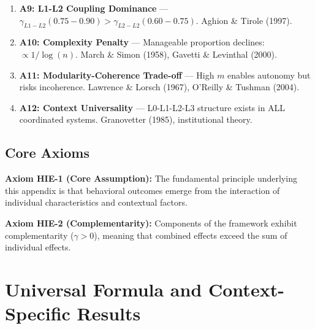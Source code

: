 \begin{enumerate}
\item \textbf{A9: L1-L2 Coupling Dominance} — $\gamma_{L1-L2} (0.75-0.90) > \gamma_{L2-L2} (0.60-0.75)$. Aghion \& Tirole (1997).

\item \textbf{A10: Complexity Penalty} — Manageable proportion declines: $\propto 1/\log(n)$. March \& Simon (1958), Gavetti \& Levinthal (2000).

\item \textbf{A11: Modularity-Coherence Trade-off} — High $m$ enables autonomy but risks incoherence. Lawrence \& Lorsch (1967), O'Reilly \& Tushman (2004).

\item \textbf{A12: Context Universality} — L0-L1-L2-L3 structure exists in ALL coordinated systems. Granovetter (1985), institutional theory.

\end{enumerate}



\subsection{Core Axioms}
\label{sec:hie-axioms}

\begin{tcolorbox}[colback=yellow!5!white,colframe=yellow!75!black,title=Axiom HIE-1: Fundamental Principle]
\textbf{Axiom HIE-1 (Core Assumption):}
The fundamental principle underlying this appendix is that behavioral outcomes
emerge from the interaction of individual characteristics and contextual factors.
\end{tcolorbox}

\begin{tcolorbox}[colback=yellow!5!white,colframe=yellow!75!black,title=Axiom HIE-2: Complementarity]
\textbf{Axiom HIE-2 (Complementarity):}
Components of the framework exhibit complementarity ($\gamma > 0$), meaning
that combined effects exceed the sum of individual effects.
\end{tcolorbox}


\section{Universal Formula and Context-Specific Results}

